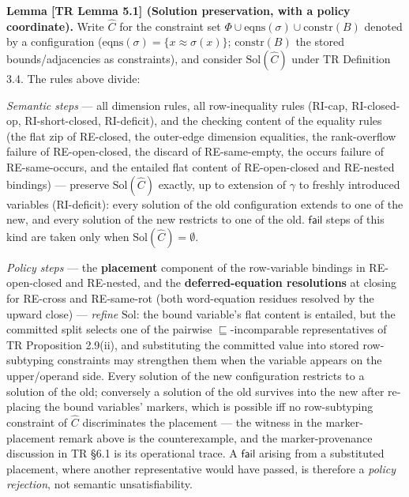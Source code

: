 \documentclass[
  10pt,
  letterpaper,
]{article}
\begin{document}
\textbf{Lemma {[}TR Lemma 5.1{]} (Solution preservation, with a policy
coordinate).} Write \(\widehat{C}\) for the constraint set
\(\Phi \cup \mathrm{eqns}(\sigma) \cup \mathrm{constr}(B)\) denoted by a
configuration (\(\mathrm{eqns}(\sigma) = \{x \approx \sigma(x)\}\);
\(\mathrm{constr}(B)\) the stored bounds/adjacencies as constraints),
and consider \(\mathrm{Sol}(\widehat{C})\) under TR Definition 3.4. The
rules above divide:

\emph{Semantic steps} --- all dimension rules, all row-inequality rules
(RI-cap, RI-closed-op, RI-short-closed, RI-deficit), and the checking
content of the equality rules (the flat zip of RE-closed, the outer-edge
dimension equalities, the rank-overflow failure of RE-open-closed, the
discard of RE-same-empty, the occurs failure of RE-same-occurs, and the
entailed flat content of RE-open-closed and RE-nested bindings) ---
preserve \(\mathrm{Sol}(\widehat{C})\) exactly, up to extension of
\(\gamma\) to freshly introduced variables (RI-deficit): every solution
of the old configuration extends to one of the new, and every solution
of the new restricts to one of the old. \(\mathsf{fail}\) steps of this
kind are taken only when \(\mathrm{Sol}(\widehat{C}) = \emptyset\).

\emph{Policy steps} --- the \textbf{placement} component of the
row-variable bindings in RE-open-closed and RE-nested, and the
\textbf{deferred-equation resolutions} at closing for RE-cross and
RE-same-rot (both word-equation residues resolved by the upward close)
--- \emph{refine} \(\mathrm{Sol}\): the bound variable's flat content is
entailed, but the committed split selects one of the pairwise
\(\sqsubseteq\)-incomparable representatives of TR Proposition 2.9(ii),
and substituting the committed value into stored row-subtyping
constraints may strengthen them when the variable appears on the
upper/operand side. Every solution of the new configuration restricts to
a solution of the old; conversely a solution of the old survives into
the new after re-placing the bound variables' markers, which is possible
iff no row-subtyping constraint of \(\widehat{C}\) discriminates the
placement --- the witness in the marker-placement remark above is the
counterexample, and the marker-provenance discussion in TR §6.1 is its
operational trace. A \(\mathsf{fail}\) arising from a substituted
placement, where another representative would have passed, is therefore
a \emph{policy rejection}, not semantic unsatisfiability.
\end{document}
